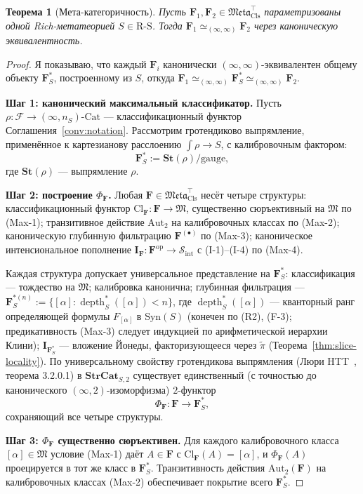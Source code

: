 \documentclass[11pt]{article}
\theoremstyle{plain}
\newtheorem{theorem}{Теорема}[section]
\theoremstyle{definition}
\newcommand{\RS}{\mathrm{R\text{-}S}}
\newcommand{\cS}{\mathcal{S}}
\newcommand{\cF}{\mathcal{F}}
\newcommand{\fM}{\mathfrak{M}}
\newcommand{\Meta}{\mathfrak{Meta}}
\newcommand{\Sint}{\cS_{\mathrm{int}}}
\newcommand{\Cl}{\mathrm{Cl}}
\newcommand{\Cat}{\mathrm{Cat}}
\newcommand{\Syn}{\mathrm{Syn}}
\newcommand{\II}{\mathbf{I}}
\DeclareMathOperator{\dep}{depth}
\begin{document}
\begin{theorem}[Мета-категоричность]\label{thm:meta-cat}
Пусть $\mathbf{F}_1, \mathbf{F}_2 \in \Meta_{\mathrm{Cls}}^{\top}$ параметризованы одной Rich-метатеорией $S \in \RS$. Тогда $\mathbf{F}_1 \simeq_{(\infty, \infty)} \mathbf{F}_2$ через каноническую эквивалентность.
\end{theorem}

\begin{proof}
Я показываю, что каждый $\mathbf{F}_i$ канонически $(\infty, \infty)$-эквивалентен общему объекту $\mathbf{F}_S^*$, построенному из $S$, откуда $\mathbf{F}_1 \simeq_{(\infty, \infty)} \mathbf{F}_S^* \simeq_{(\infty, \infty)} \mathbf{F}_2$.

\textbf{Шаг 1: канонический максимальный классификатор.} Пусть $\rho : \cF \to (\infty, n_S)\text{-}\Cat$ — классификационный функтор Соглашения~\ref{conv:notation}. Рассмотрим гротендиково выпрямление, применённое к картезианову расслоению $\int \rho \to S$, с калибровочным фактором:
\[ \mathbf{F}_S^* := \mathbf{St}(\rho) / \mathrm{gauge}, \]
где $\mathbf{St}(\rho)$ — выпрямление $\rho$.

\textbf{Шаг 2: построение $\Phi_\mathbf{F}$.} Любая $\mathbf{F} \in \Meta_{\mathrm{Cls}}^{\top}$ несёт четыре структуры: классификационный функтор $\Cl_{\mathbf{F}} : \mathbf{F} \to \fM$, существенно сюръективный на $\fM$ по (Max-1); транзитивное действие $\mathrm{Aut}_2$ на калибровочных классах по (Max-2); каноническую глубинную фильтрацию $\mathbf{F}^{(\bullet)}$ по (Max-3); каноническое интенсиональное пополнение $\II_{\mathbf{F}} : \mathbf{F}^{\mathrm{op}} \to \Sint$ с (I-1)--(I-4) по (Max-4).

Каждая структура допускает универсальное представление на $\mathbf{F}_S^*$: классификация — тождество на $\fM$; калибровка канонична; глубинная фильтрация — $\mathbf{F}_S^{*(n)} := \{[\alpha] : \dep_S^*([\alpha]) < n\}$, где $\dep_S^*([\alpha])$ — кванторный ранг определяющей формулы $F_{[\alpha]}$ в $\Syn(S)$ (конечен по (R2), (F-3); предикативность (Max-3) следует индукцией по арифметической иерархии Клини); $\II_{\mathbf{F}_S^*}$ — вложение Йонеды, факторизующееся через $\tilde\pi$ (Теорема~\ref{thm:slice-locality}). По универсальному свойству гротендикова выпрямления (Люри HTT~\cite{LurieHTT}, теорема 3.2.0.1) в $\mathbf{StrCat}_{S, 2}$ существует единственный (с точностью до канонического $(\infty, 2)$-изоморфизма) $2$-функтор
\[ \Phi_\mathbf{F} : \mathbf{F} \to \mathbf{F}_S^*, \]
сохраняющий все четыре структуры.

\textbf{Шаг 3: $\Phi_\mathbf{F}$ существенно сюръективен.} Для каждого калибровочного класса $[\alpha] \in \fM$ условие (Max-1) даёт $A \in \mathbf{F}$ с $\Cl_\mathbf{F}(A) = [\alpha]$, и $\Phi_\mathbf{F}(A)$ проецируется в тот же класс в $\mathbf{F}_S^*$. Транзитивность действия $\mathrm{Aut}_2(\mathbf{F})$ на калибровочных классах (Max-2) обеспечивает покрытие всего $\mathbf{F}_S^*$.


\end{proof}
\end{document}

